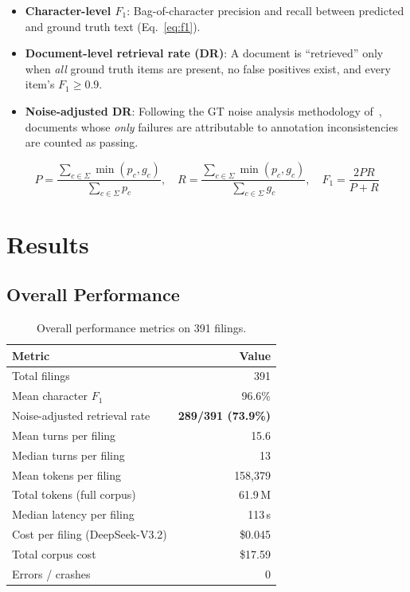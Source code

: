 \documentclass[11pt,a4paper]{article}
\begin{document}
\begin{itemize}[nosep]
    \item \textbf{Character-level $F_1$}: Bag-of-character precision and recall between predicted and ground truth text (Eq.~\ref{eq:f1}).
    \item \textbf{Document-level retrieval rate (DR)}: A document is ``retrieved'' only when \emph{all} ground truth items are present, no false positives exist, and every item's $F_1 \geq 0.9$.
    \item \textbf{Noise-adjusted DR}: Following the GT noise analysis methodology of~\cite{bi2026anchor}, documents whose \emph{only} failures are attributable to annotation inconsistencies are counted as passing.
\end{itemize}

\begin{equation}\label{eq:f1}
P = \frac{\sum_{c \in \Sigma} \min(p_c, g_c)}{\sum_{c \in \Sigma} p_c}, \quad
R = \frac{\sum_{c \in \Sigma} \min(p_c, g_c)}{\sum_{c \in \Sigma} g_c}, \quad
F_1 = \frac{2PR}{P+R}
\end{equation}


\section{Results}\label{sec:results}

\subsection{Overall Performance}

\begin{table}[H]
\centering
\caption{Overall performance metrics on 391 filings.}
\label{tab:overall}
\begin{tabular}{lr}
\toprule
\textbf{Metric} & \textbf{Value}\\
\midrule
Total filings & 391\\
Mean character $F_1$ & 96.6\%\\
Noise-adjusted retrieval rate & \textbf{289/391 (73.9\%)}\\
\midrule
Mean turns per filing & 15.6\\
Median turns per filing & 13\\
Mean tokens per filing & 158,379\\
Total tokens (full corpus) & 61.9\,M\\
Median latency per filing & 113\,s\\
Cost per filing (DeepSeek-V3.2) & \$0.045\\
Total corpus cost & \$17.59\\
Errors / crashes & 0\\
\bottomrule
\end{tabular}
\end{table}
\end{document}
